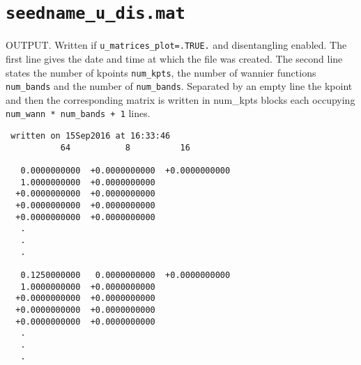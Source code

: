\section{{\tt seedname\_u\_dis.mat}}

OUTPUT. Written if {\tt u\_matrices\_plot=.TRUE.} and disentangling enabled.
The first line gives the date and time at which the file was created.
The second line states the number of kpoints {\tt num\_kpts}, the number of wannier
functions {\tt num\_bands} and the number of {\tt num\_bands}.
Separated by an empty line the kpoint and then the corresponding matrix is written
in num\_kpts blocks each occupying {\tt num\_wann * num\_bands + 1} lines.

\begin{verbatim}
 written on 15Sep2016 at 16:33:46 
           64           8          16
	    
   0.0000000000  +0.0000000000  +0.0000000000
   1.0000000000  +0.0000000000
  +0.0000000000  +0.0000000000
  +0.0000000000  +0.0000000000
  +0.0000000000  +0.0000000000
   .
   .
   .
   
   0.1250000000   0.0000000000  +0.0000000000
   1.0000000000  +0.0000000000
  +0.0000000000  +0.0000000000
  +0.0000000000  +0.0000000000
  +0.0000000000  +0.0000000000
   .
   .
   .
\end{verbatim}
